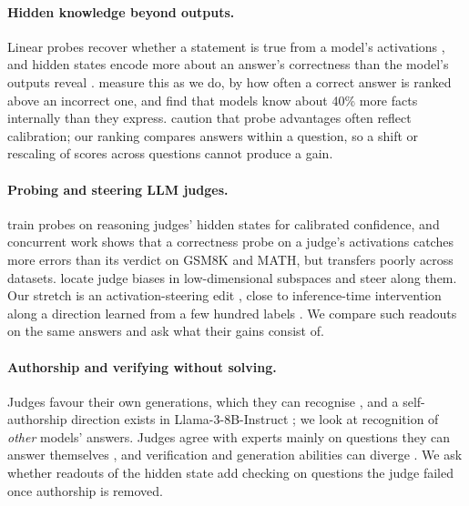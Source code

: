 \paragraph{Hidden knowledge beyond outputs.} Linear probes recover whether a statement is true from a model's activations \citep{azaria-mitchell-2023-internal,burns2023discovering,marks2024geometry}, and hidden states encode more about an answer's correctness than the model's outputs reveal \citep{kadavath2022language,orgad2025llms}. \citet{gekhman2025insideout} measure this as we do, by how often a correct answer is ranked above an incorrect one, and find that models know about 40\% more facts internally than they express. \citet{liu-etal-2023-cognitive} caution that probe advantages often reflect calibration; our ranking compares answers within a question, so a shift or rescaling of scores across questions cannot produce a gain.

\paragraph{Probing and steering LLM judges.} \citet{radharapu-etal-2026-calibrating} train probes on reasoning judges' hidden states for calibrated confidence, and concurrent work \citep{gulati2026auditing} shows that a correctness probe on a judge's activations catches more errors than its verdict on GSM8K and MATH, but transfers poorly across datasets. \citet{xu2026unfair} locate judge biases in low-dimensional subspaces and steer along them. Our stretch is an activation-steering edit \citep{turner2023steering,rimsky-etal-2024-steering,zou2023representation}, close to inference-time intervention along a direction learned from a few hundred labels \citep{li2023iti}. We compare such readouts on the same answers and ask what their gains consist of.

\paragraph{Authorship and verifying without solving.} Judges favour their own generations, which they can recognise \citep{panickssery2024llm}, and a self-authorship direction exists in Llama-3-8B-Instruct \citep{ackerman2025inspection}; we look at recognition of \emph{other} models' answers. Judges agree with experts mainly on questions they can answer themselves \citep{krumdick2026nofreelabels,tan2025judgebench}, and verification and generation abilities can diverge \citep{west2024generative,song2025mind,cobbe2021training,zhang2025reasoning}. We ask whether readouts of the hidden state add checking on questions the judge failed once authorship is removed.
